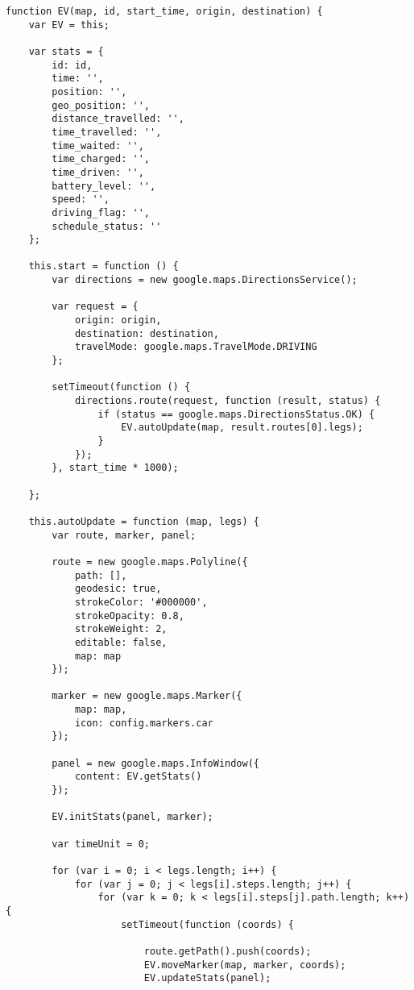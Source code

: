 \begin{verbatim}
function EV(map, id, start_time, origin, destination) {
    var EV = this;

    var stats = {
        id: id,
        time: '',
        position: '',
        geo_position: '',
        distance_travelled: '',
        time_travelled: '',
        time_waited: '',
        time_charged: '',
        time_driven: '',
        battery_level: '',
        speed: '',
        driving_flag: '',
        schedule_status: ''
    };

    this.start = function () {
        var directions = new google.maps.DirectionsService();

        var request = {
            origin: origin,
            destination: destination,
            travelMode: google.maps.TravelMode.DRIVING
        };

        setTimeout(function () {
            directions.route(request, function (result, status) {
                if (status == google.maps.DirectionsStatus.OK) {
                    EV.autoUpdate(map, result.routes[0].legs);
                }
            });
        }, start_time * 1000);

    };

    this.autoUpdate = function (map, legs) {
        var route, marker, panel;

        route = new google.maps.Polyline({
            path: [],
            geodesic: true,
            strokeColor: '#000000',
            strokeOpacity: 0.8,
            strokeWeight: 2,
            editable: false,
            map: map
        });

        marker = new google.maps.Marker({
            map: map,
            icon: config.markers.car
        });

        panel = new google.maps.InfoWindow({
            content: EV.getStats()
        });

        EV.initStats(panel, marker);

        var timeUnit = 0;

        for (var i = 0; i < legs.length; i++) {
            for (var j = 0; j < legs[i].steps.length; j++) {
                for (var k = 0; k < legs[i].steps[j].path.length; k++) {
                    setTimeout(function (coords) {

                        route.getPath().push(coords);
                        EV.moveMarker(map, marker, coords);
                        EV.updateStats(panel);


\end{verbatim}
